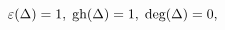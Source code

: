 \begin{equation}
\varepsilon(\Delta)=1,\;\hbox{gh}(\Delta)=1,\;\hbox{deg}
(\Delta)=0,\label{3.23}%
\end{equation}

